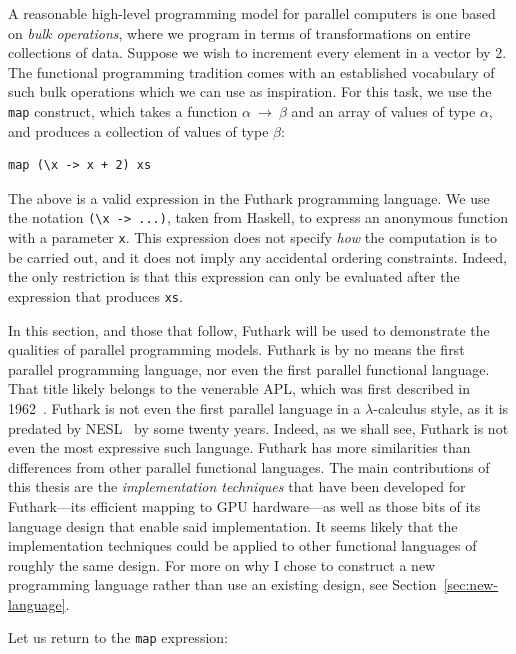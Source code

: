 A reasonable high-level programming model for parallel computers is
one based on \textit{bulk operations}, where we program in terms of
transformations on entire collections of data.  Suppose we wish to
increment every element in a vector by $2$.  The functional
programming tradition comes with an established vocabulary of such
bulk operations which we can use as inspiration.  For this task, we
use the \lstinline{map} construct, which takes a function
$\alpha~\rightarrow~\beta$ and an array of values of type $\alpha$,
and produces a collection of values of type $\beta$:

\begin{lstlisting}
map (\x -> x + 2) xs
\end{lstlisting}

The above is a valid expression in the Futhark programming language.
We use the notation \lstinline{(\x -> ...)}, taken from Haskell, to
express an anonymous function with a parameter \lstinline{x}.  This
expression does not specify \textit{how} the computation is to be
carried out, and it does not imply any accidental ordering
constraints.  Indeed, the only restriction is that this expression can
only be evaluated after the expression that produces \lstinline{xs}.

In this section, and those that follow, Futhark will be used to
demonstrate the qualities of parallel programming models.  Futhark is
by no means the first parallel programming language, nor even the
first parallel functional language.  That title likely belongs to the
venerable APL, which was first described in 1962~\cite{iversonbook}.
Futhark is not even the first parallel language in a
$\lambda$-calculus style, as it is predated by
NESL~\cite{BlellochCACM96NESL} by some twenty years.  Indeed, as we
shall see, Futhark is not even the most expressive such language.
Futhark has more similarities than differences from other parallel
functional languages.  The main contributions of this thesis are the
\textit{implementation techniques} that have been developed for
Futhark---its efficient mapping to GPU hardware---as well as those
bits of its language design that enable said implementation.  It seems
likely that the implementation techniques could be applied to other
functional languages of roughly the same design.  For more on why I
chose to construct a new programming language rather than use an
existing design, see Section~\ref{sec:new-language}.

Let us return to the \lstinline{map} expression:

